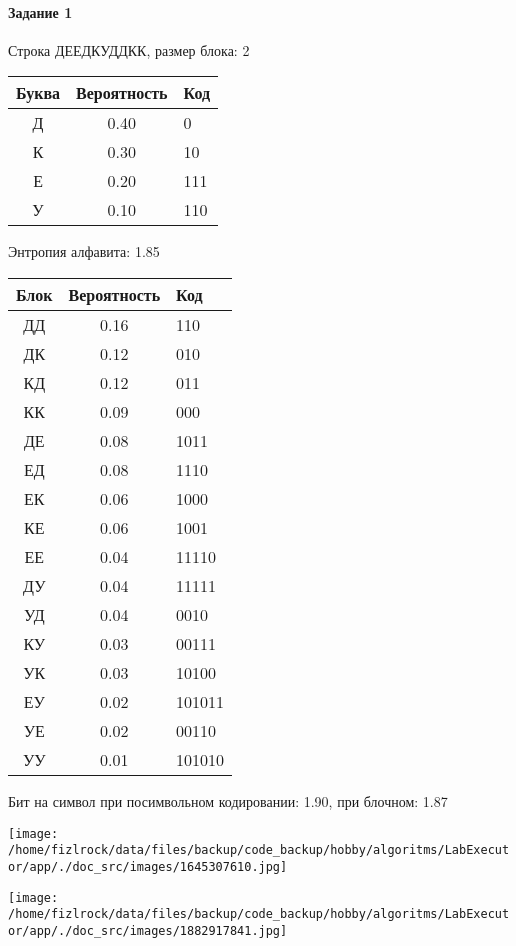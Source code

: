 \documentclass[a4paper, 12pt]{article}
\begin{document}
\paragraph{Задание 1}

Строка ДЕЕДКУДДКК, размер блока: 2
\begin{center}
 \begin{tabular}{ |c|c|l| } 
  \hline
     Буква & Вероятность & Код\\ \hline
Д & 0.40 & 0\\\hline
К & 0.30 & 10\\\hline
Е & 0.20 & 111\\\hline
У & 0.10 & 110
\\ \hline \end{tabular}
\end{center}
Энтропия алфавита: 1.85
\begin{center}
 \begin{tabular}{ |c|c|l| } 
  \hline
     Блок & Вероятность & Код\\ \hline
ДД & 0.16 & 110\\\hline
ДК & 0.12 & 010\\\hline
КД & 0.12 & 011\\\hline
КК & 0.09 & 000\\\hline
ДЕ & 0.08 & 1011\\\hline
ЕД & 0.08 & 1110\\\hline
ЕК & 0.06 & 1000\\\hline
КЕ & 0.06 & 1001\\\hline
ЕЕ & 0.04 & 11110\\\hline
ДУ & 0.04 & 11111\\\hline
УД & 0.04 & 0010\\\hline
КУ & 0.03 & 00111\\\hline
УК & 0.03 & 10100\\\hline
ЕУ & 0.02 & 101011\\\hline
УЕ & 0.02 & 00110\\\hline
УУ & 0.01 & 101010
\\ \hline \end{tabular}
\end{center}
Бит на символ при посимвольном кодировании: 1.90, при блочном: 1.87

\texttt{[image: /home/fizlrock/data/files/backup/code\_backup/hobby/algoritms/LabExecutor/app/./doc\_src/images/1645307610.jpg]}

\texttt{[image: /home/fizlrock/data/files/backup/code\_backup/hobby/algoritms/LabExecutor/app/./doc\_src/images/1882917841.jpg]}
\pagebreak
\end{document}
